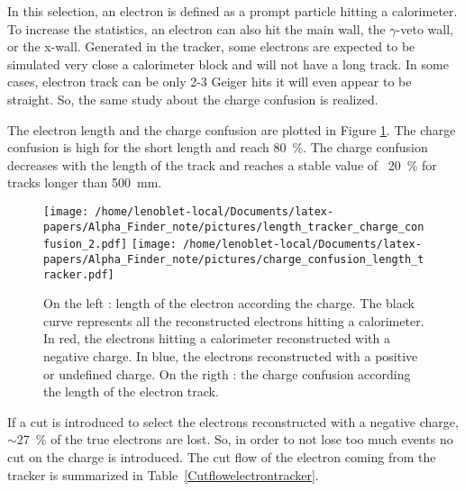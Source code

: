 \documentclass[main.tex]{subfiles}
\begin{document}
\noindent In this selection, an electron is defined as a prompt particle hitting a calorimeter. To increase the statistics, an electron can also hit the main wall, the $\gamma$-veto wall, or the x-wall. Generated in the tracker, some electrons are expected to be simulated very close a calorimeter block and will not have a long track. In some cases, electron track can be only 2-3 Geiger hits it will even appear to be straight. So, the same study about the charge confusion is realized.


\bigskip


\noindent The electron length and the charge confusion are plotted in Figure \ref{charge_confusion_tracker_plots}. The charge confusion is high for the short length and reach 80~\%. The charge confusion decreases with the length of the track and reaches a stable value of ~20~\% for tracks longer than 500~mm.


\begin{figure}[h!]
\begin{center}
\texttt{[image: /home/lenoblet-local/Documents/latex-papers/Alpha\_Finder\_note/pictures/length\_tracker\_charge\_confusion\_2.pdf]}
\texttt{[image: /home/lenoblet-local/Documents/latex-papers/Alpha\_Finder\_note/pictures/charge\_confusion\_length\_tracker.pdf]}
\caption{On the left : length of the electron according the charge. The black curve represents all the reconstructed electrons hitting a calorimeter. In red, the electrons hitting a calorimeter reconstructed with a negative charge. In blue, the electrons reconstructed with a positive or undefined charge. On the rigth : the charge confusion according the length of the electron track.}
\label{charge_confusion_tracker_plots}
\end{center}
\end{figure}


\bigskip 


\noindent If a cut is introduced to select the electrons reconstructed with a negative charge, $\sim$27~\% of the true electrons are lost. So, in order to not lose too much events no cut on the charge is introduced.  The cut flow of the electron coming from the tracker is summarized in Table~\ref{Cutflowelectrontracker}. 
\end{document}
